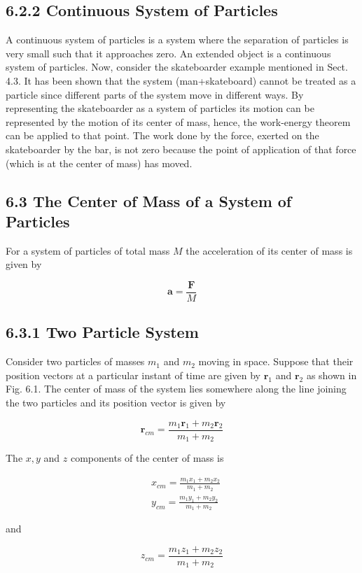 \documentclass[10pt]{article}
\begin{document}
\subsection*{6.2.2 Continuous System of Particles}
A continuous system of particles is a system where the separation of particles is very small such that it approaches zero. An extended object is a continuous system of particles. Now, consider the skateboarder example mentioned in Sect. 4.3. It has been shown that the system (man+skateboard) cannot be treated as a particle since different parts of the system move in different ways. By representing the skateboarder as a system of particles its motion can be represented by the motion of its center of mass, hence, the work-energy theorem can be applied to that point. The work done by the force, exerted on the skateboarder by the bar, is not zero because the point of application of that force (which is at the center of mass) has moved.

\subsection*{6.3 The Center of Mass of a System of Particles}
For a system of particles of total mass $M$ the acceleration of its center of mass is given by

$$
\mathbf{a}=\frac{\mathbf{F}}{M}
$$

\subsection*{6.3.1 Two Particle System}
Consider two particles of masses $m_{1}$ and $m_{2}$ moving in space. Suppose that their position vectors at a particular instant of time are given by $\mathbf{r}_{1}$ and $\mathbf{r}_{2}$ as shown in Fig. 6.1. The center of mass of the system lies somewhere along the line joining the two particles and its position vector is given by

$$
\mathbf{r}_{c m}=\frac{m_{1} \mathbf{r}_{1}+m_{2} \mathbf{r}_{2}}{m_{1}+m_{2}}
$$

The $x, y$ and $z$ components of the center of mass is

$$
\begin{aligned}
& x_{c m}=\frac{m_{1} x_{1}+m_{2} x_{2}}{m_{1}+m_{2}} \\
& y_{c m}=\frac{m_{1} y_{1}+m_{2} y_{2}}{m_{1}+m_{2}}
\end{aligned}
$$

and

$$
z_{c m}=\frac{m_{1} z_{1}+m_{2} z_{2}}{m_{1}+m_{2}}
$$
\end{document}
